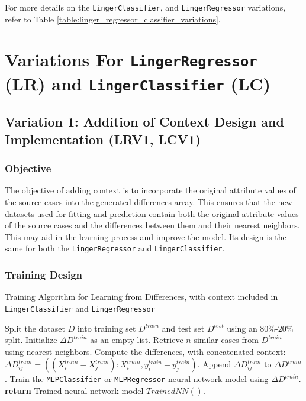 \documentclass[a4paper, 12pt]{report}
\begin{document}
For more details on the \texttt{LingerClassifier}, and \texttt{LingerRegressor} variations, refer to Table 
\ref{table:linger_regressor_classifier_variations}.

\section{Variations For \texttt{LingerRegressor} (LR) and \texttt{LingerClassifier} (LC)}
\subsection{Variation 1: Addition of Context Design and Implementation (LRV1, LCV1)}
\label{sec:linger_regr_class_variation1_model}

\subsubsection{Objective}
The objective of adding context is to incorporate the original attribute values of the source cases into the generated differences array. 
This ensures that the new datasets used for fitting and prediction contain both the original attribute values of the source cases and the differences between them and their nearest neighbors. 
This may aid in the learning process and improve the model. Its design is the same for both the \texttt{LingerRegressor} and \texttt{LingerClassifier}.

\subsubsection{Training Design}
\begin{algorithm}[H]
    \caption{Training Algorithm for Learning from Differences, with context included in \texttt{LingerClassifier} and \texttt{LingerRegressor}}
    \label{alg:training_variant_1_linger}
    \begin{algorithmic}[1]
        \State Split the dataset $D$ into training set $D^{train}$ and test set $D^{test}$ using an $80\%$-$20\%$ split.
        \State Initialize $\Delta D^{train}$ as an empty list.
            \State Retrieve $n$ similar cases from $D^{train}$ using nearest neighbors.
                \State Compute the differences, with concatenated context: 
                \State $\Delta D^{train}_{ij} = ((X^{train}_i - X^{train}_j):X^{train}_i, y^{train}_i - y^{train}_j)$.
                \State Append $\Delta D^{train}_{ij}$ to $\Delta D^{train}$.
            \EndFor
        \EndFor
        \State Train the \texttt{MLPClassifier} or \texttt{MLPRegressor} neural network model using $\Delta D^{train}$.
        \State \textbf{return} Trained neural network model $Trained NN()$.
    \end{algorithmic}
\end{algorithm}
\clearpage
\end{document}
